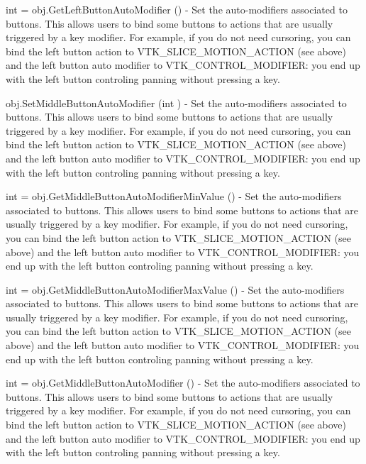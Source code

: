 \begin{DoxyItemize}
\item {\ttfamily int = obj.\-Get\-Left\-Button\-Auto\-Modifier ()} -\/ Set the auto-\/modifiers associated to buttons. This allows users to bind some buttons to actions that are usually triggered by a key modifier. For example, if you do not need cursoring, you can bind the left button action to V\-T\-K\-\_\-\-S\-L\-I\-C\-E\-\_\-\-M\-O\-T\-I\-O\-N\-\_\-\-A\-C\-T\-I\-O\-N (see above) and the left button auto modifier to V\-T\-K\-\_\-\-C\-O\-N\-T\-R\-O\-L\-\_\-\-M\-O\-D\-I\-F\-I\-E\-R\-: you end up with the left button controling panning without pressing a key.  
\item {\ttfamily obj.\-Set\-Middle\-Button\-Auto\-Modifier (int )} -\/ Set the auto-\/modifiers associated to buttons. This allows users to bind some buttons to actions that are usually triggered by a key modifier. For example, if you do not need cursoring, you can bind the left button action to V\-T\-K\-\_\-\-S\-L\-I\-C\-E\-\_\-\-M\-O\-T\-I\-O\-N\-\_\-\-A\-C\-T\-I\-O\-N (see above) and the left button auto modifier to V\-T\-K\-\_\-\-C\-O\-N\-T\-R\-O\-L\-\_\-\-M\-O\-D\-I\-F\-I\-E\-R\-: you end up with the left button controling panning without pressing a key.  
\item {\ttfamily int = obj.\-Get\-Middle\-Button\-Auto\-Modifier\-Min\-Value ()} -\/ Set the auto-\/modifiers associated to buttons. This allows users to bind some buttons to actions that are usually triggered by a key modifier. For example, if you do not need cursoring, you can bind the left button action to V\-T\-K\-\_\-\-S\-L\-I\-C\-E\-\_\-\-M\-O\-T\-I\-O\-N\-\_\-\-A\-C\-T\-I\-O\-N (see above) and the left button auto modifier to V\-T\-K\-\_\-\-C\-O\-N\-T\-R\-O\-L\-\_\-\-M\-O\-D\-I\-F\-I\-E\-R\-: you end up with the left button controling panning without pressing a key.  
\item {\ttfamily int = obj.\-Get\-Middle\-Button\-Auto\-Modifier\-Max\-Value ()} -\/ Set the auto-\/modifiers associated to buttons. This allows users to bind some buttons to actions that are usually triggered by a key modifier. For example, if you do not need cursoring, you can bind the left button action to V\-T\-K\-\_\-\-S\-L\-I\-C\-E\-\_\-\-M\-O\-T\-I\-O\-N\-\_\-\-A\-C\-T\-I\-O\-N (see above) and the left button auto modifier to V\-T\-K\-\_\-\-C\-O\-N\-T\-R\-O\-L\-\_\-\-M\-O\-D\-I\-F\-I\-E\-R\-: you end up with the left button controling panning without pressing a key.  
\item {\ttfamily int = obj.\-Get\-Middle\-Button\-Auto\-Modifier ()} -\/ Set the auto-\/modifiers associated to buttons. This allows users to bind some buttons to actions that are usually triggered by a key modifier. For example, if you do not need cursoring, you can bind the left button action to V\-T\-K\-\_\-\-S\-L\-I\-C\-E\-\_\-\-M\-O\-T\-I\-O\-N\-\_\-\-A\-C\-T\-I\-O\-N (see above) and the left button auto modifier to V\-T\-K\-\_\-\-C\-O\-N\-T\-R\-O\-L\-\_\-\-M\-O\-D\-I\-F\-I\-E\-R\-: you end up with the left button controling panning without pressing a key.  

\end{DoxyItemize}
